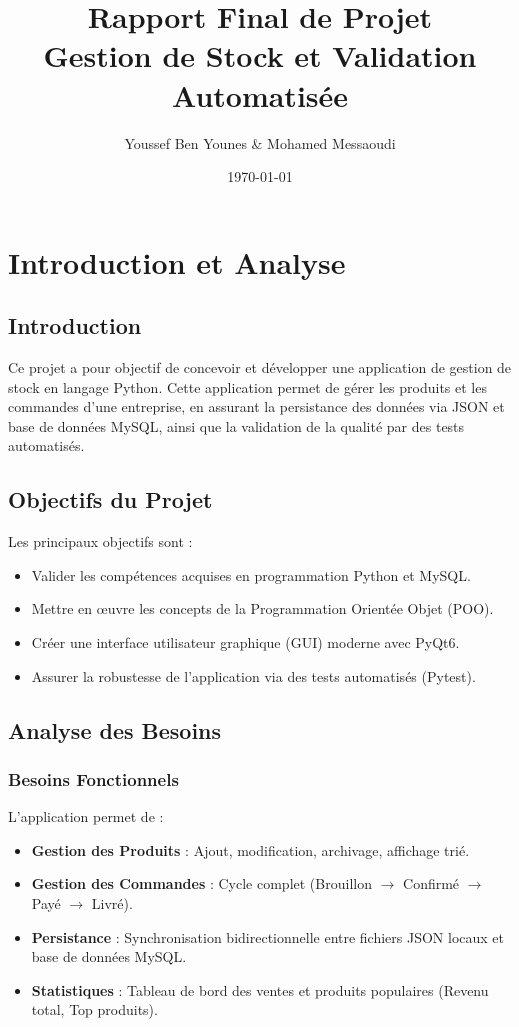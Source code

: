 \documentclass[12pt,a4paper]{report}
\title{\textbf{Rapport Final de Projet}\\Gestion de Stock et Validation Automatisée}
\author{Youssef Ben Younes \& Mohamed Messaoudi}
\date{\today}
\begin{document}
\maketitle

\tableofcontents

\chapter{Introduction et Analyse}
\section{Introduction}
Ce projet a pour objectif de concevoir et développer une application de gestion de stock en langage Python. Cette application permet de gérer les produits et les commandes d'une entreprise, en assurant la persistance des données via JSON et base de données MySQL, ainsi que la validation de la qualité par des tests automatisés.

\section{Objectifs du Projet}
Les principaux objectifs sont :
\begin{itemize}
    \item Valider les compétences acquises en programmation Python et MySQL.
    \item Mettre en œuvre les concepts de la Programmation Orientée Objet (POO).
    \item Créer une interface utilisateur graphique (GUI) moderne avec PyQt6.
    \item Assurer la robustesse de l'application via des tests automatisés (Pytest).
\end{itemize}

\section{Analyse des Besoins}
\subsection{Besoins Fonctionnels}
L'application permet de :
\begin{itemize}
    \item \textbf{Gestion des Produits} : Ajout, modification, archivage, affichage trié.
    \item \textbf{Gestion des Commandes} : Cycle complet (Brouillon $\rightarrow$ Confirmé $\rightarrow$ Payé $\rightarrow$ Livré).
    \item \textbf{Persistance} : Synchronisation bidirectionnelle entre fichiers JSON locaux et base de données MySQL.
    \item \textbf{Statistiques} : Tableau de bord des ventes et produits populaires (Revenu total, Top produits).
\end{itemize}
\end{document}
